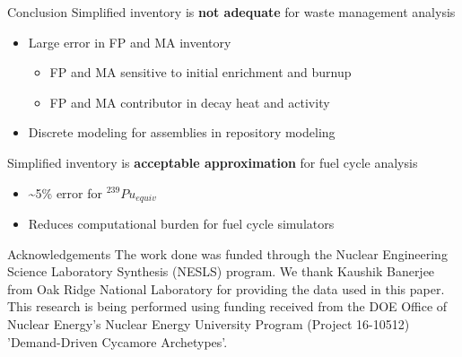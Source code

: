 \documentclass[final]{beamer}
\newlength{\onecolwid}
\newlength{\threecolwid}
\begin{document}
\begin{frame}[t]
\begin{columns}[t,totalwidth=\threecolwid]
\begin{column}{\onecolwid}
\begin{alertblock}{Conclusion}
Simplified inventory is \textbf{not adequate} for waste management analysis
    \begin{itemize}
        \item Large error in FP and MA inventory
        \begin{itemize}
            \item FP and MA sensitive to initial enrichment and burnup
            \item FP and MA contributor in decay heat and activity
        \end{itemize}
        \item Discrete modeling for assemblies in repository modeling
    \end{itemize}
\bigskip \bigskip

Simplified inventory is \textbf{acceptable approximation} for fuel cycle analysis
    \begin{itemize}
        \item \textasciitilde 5\% error for $^{239}Pu_{equiv}$
        \item Reduces computational burden for fuel cycle simulators
    \end{itemize}
\end{alertblock}



\begin{block}{Acknowledgements}
The work done was funded through the Nuclear Engineering Science
Laboratory Synthesis (NESLS) program. We thank Kaushik Banerjee
from Oak Ridge National Laboratory for providing the data used
in this paper.
This research is being performed using funding received from the DOE Office
of Nuclear Energy's Nuclear Energy University Program
(Project 16-10512) 'Demand-Driven Cycamore Archetypes'.

\end{block}







\end{column}
\end{columns}
\end{frame}
\end{document}
